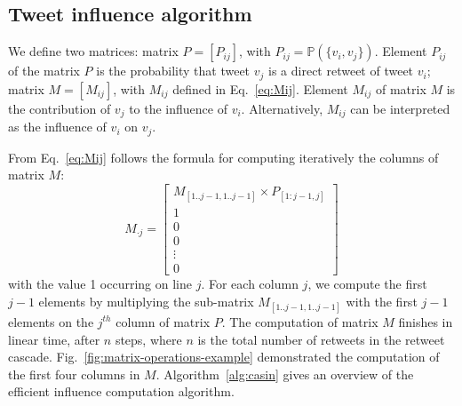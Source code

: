 \subsection{Tweet influence algorithm}

We define two matrices:
matrix $P = [ P_{ij} ]$, with $P_{ij} = \mathds{P}(\{v_i, v_j\})$.
Element $P_{ij}$ of the matrix $P$ is the probability that tweet $v_j$ is a direct retweet of tweet $v_i$;
matrix $M = [ M_{ij} ]$, with $M_{ij}$ defined in Eq.~\eqref{eq:Mij}.
Element $M_{ij}$ of matrix $M$ is the contribution of $v_j$ to the influence of $v_i$.
Alternatively, $M_{ij}$ can be interpreted as the influence of $v_i$ on $v_j$.

From Eq.~\eqref{eq:Mij} follows the formula for computing iteratively the columns of matrix $M$:
\begin{equation} \label{eq:Mij-matrix}
M_{ \cdot j}=
\left[
\begin{array}{c}
M_{[1..j-1, 1..j-1]} \times P_{[1:j-1,j]} \\
1 \\
0 \\
0 \\
\vdots \\
0 
\end{array}
\right]
\end{equation}
with the value 1 occurring on line $j$.
For each column $j$, we compute the first $j-1$ elements by multiplying the sub-matrix $M_{[1..j-1, 1..j-1]}$ with the first $j-1$ elements on the $j^{th}$ column of matrix $P$.
The computation of matrix $M$ finishes in linear time, after $n$ steps, where $n$ is the total number of retweets in the retweet cascade.
Fig.~\ref{fig:matrix-operations-example} demonstrated the computation of the first four columns in $M$.
Algorithm~\ref{alg:casin} gives an overview of the efficient influence computation algorithm.
